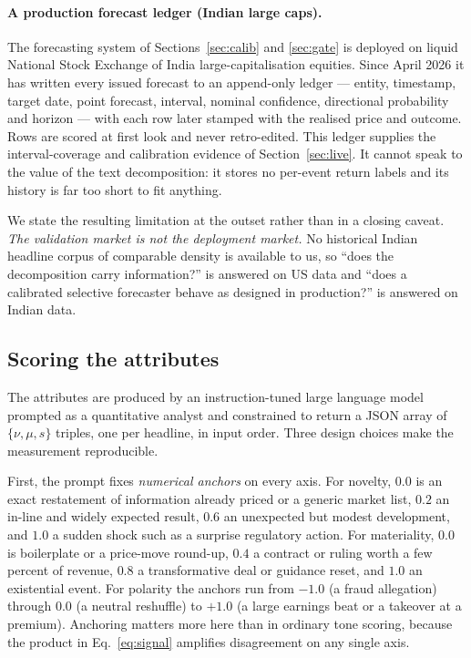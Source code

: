 \documentclass[preprint,12pt,authoryear]{elsarticle}
\theoremstyle{plain}
\theoremstyle{remark}
\begin{document}
\paragraph{A production forecast ledger (Indian large caps).} The forecasting
system of Sections~\ref{sec:calib} and \ref{sec:gate} is deployed on liquid
National Stock Exchange of India large-capitalisation equities. Since April 2026
it has written every issued forecast to an append-only ledger --- entity,
timestamp, target date, point forecast, interval, nominal confidence,
directional probability and horizon --- with each row later stamped with the
realised price and outcome. Rows are scored at first look and never retro-edited.
This ledger supplies the interval-coverage and calibration evidence of
Section~\ref{sec:live}. It cannot speak to the value of the text decomposition:
it stores no per-event return labels and its history is far too short to fit
anything.

We state the resulting limitation at the outset rather than in a closing caveat.
\emph{The validation market is not the deployment market.} No historical Indian
headline corpus of comparable density is available to us, so ``does the
decomposition carry information?'' is answered on US data and ``does a
calibrated selective forecaster behave as designed in production?'' is answered
on Indian data.



\subsection{Scoring the attributes}\label{sec:scoring}

The attributes are produced by an instruction-tuned large language model
prompted as a quantitative analyst and constrained to return a JSON array of
$\{\nu,\mu,s\}$ triples, one per headline, in input order. Three design choices
make the measurement reproducible.

First, the prompt fixes \emph{numerical anchors} on every axis. For novelty,
$0.0$ is an exact restatement of information already priced or a generic market
list, $0.2$ an in-line and widely expected result, $0.6$ an unexpected but
modest development, and $1.0$ a sudden shock such as a surprise regulatory
action. For materiality, $0.0$ is boilerplate or a price-move round-up, $0.4$ a
contract or ruling worth a few percent of revenue, $0.8$ a transformative deal
or guidance reset, and $1.0$ an existential event. For polarity the anchors run
from $-1.0$ (a fraud allegation) through $0.0$ (a neutral reshuffle) to $+1.0$
(a large earnings beat or a takeover at a premium). Anchoring matters more here
than in ordinary tone scoring, because the product in Eq.~\eqref{eq:signal}
amplifies disagreement on any single axis.
\end{document}
